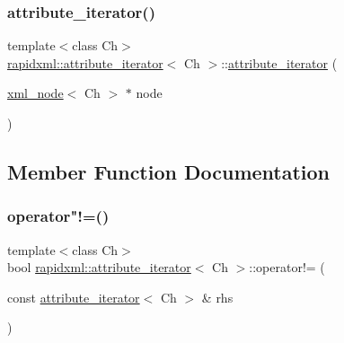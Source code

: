 \subsubsection{\texorpdfstring{attribute\+\_\+iterator()}{attribute\_iterator()}\hspace{0.1cm}{\footnotesize\ttfamily [4/4]}}
{\footnotesize\ttfamily template$<$class Ch$>$ \\
\mbox{\hyperlink{classrapidxml_1_1attribute__iterator}{rapidxml\+::attribute\+\_\+iterator}}$<$ Ch $>$\+::\mbox{\hyperlink{classrapidxml_1_1attribute__iterator}{attribute\+\_\+iterator}} (\begin{DoxyParamCaption}\item[{\mbox{\hyperlink{classrapidxml_1_1xml__node}{xml\+\_\+node}}$<$ Ch $>$ $\ast$}]{node }\end{DoxyParamCaption})\hspace{0.3cm}{\ttfamily [inline]}}



\subsection{Member Function Documentation}
\mbox{\label{classrapidxml_1_1attribute__iterator_a39e8cf336c324521fd9c720abf280d88}} 
\subsubsection{\texorpdfstring{operator"!=()}{operator!=()}\hspace{0.1cm}{\footnotesize\ttfamily [1/2]}}
{\footnotesize\ttfamily template$<$class Ch$>$ \\
bool \mbox{\hyperlink{classrapidxml_1_1attribute__iterator}{rapidxml\+::attribute\+\_\+iterator}}$<$ Ch $>$\+::operator!= (\begin{DoxyParamCaption}\item[{const \mbox{\hyperlink{classrapidxml_1_1attribute__iterator}{attribute\+\_\+iterator}}$<$ Ch $>$ \&}]{rhs }\end{DoxyParamCaption})\hspace{0.3cm}{\ttfamily [inline]}}

\mbox{\label{classrapidxml_1_1attribute__iterator_a39e8cf336c324521fd9c720abf280d88}} 
